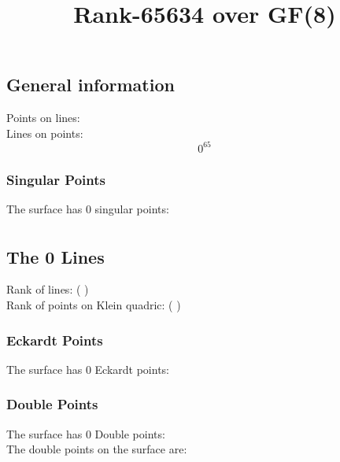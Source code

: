 \documentclass{article}
\newcommand\setTBstruts{\def\T{\rule{0pt}{2.6ex}}%
\def\B{\rule[-1.2ex]{0pt}{0pt}}}
\begin{document}
 
\setTBstruts



{\allowdisplaybreaks%






\title{Rank-65634 over GF(8)}
\author{}%
\maketitle%
%
{}



\subsection*{General information}
Points on lines:
$$
$$
Lines on points:
$$
0^{65}$$
\subsubsection*{Singular Points}
The surface has 0 singular points:\\
\begin{align*}
\end{align*}
\subsection*{The 0 Lines}
Rank of lines: (  )\\
Rank of points on Klein quadric: (  )\\
\subsubsection*{Eckardt Points}
The surface has 0 Eckardt points:\\
\subsubsection*{Double Points}
The surface has 0 Double points:\\
The double points on the surface are:\\
\begin{multicols}{2}
\noindent
\end{multicols}
}
\end{document}

